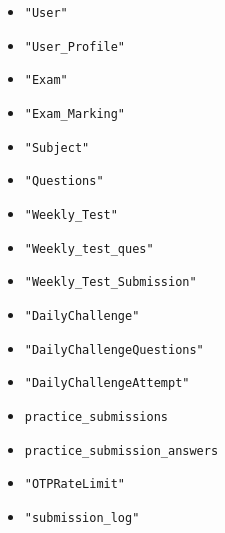 \documentclass[12pt,a4paper]{article}
\begin{document}
\begin{itemize}[leftmargin=1.5em]
  \item \texttt{"User"}
  \item \texttt{"User\_Profile"}
  \item \texttt{"Exam"}
  \item \texttt{"Exam\_Marking"}
  \item \texttt{"Subject"}
  \item \texttt{"Questions"}
  \item \texttt{"Weekly\_Test"}
  \item \texttt{"Weekly\_test\_ques"}
  \item \texttt{"Weekly\_Test\_Submission"}
  \item \texttt{"DailyChallenge"}
  \item \texttt{"DailyChallengeQuestions"}
  \item \texttt{"DailyChallengeAttempt"}
  \item \texttt{practice\_submissions}
  \item \texttt{practice\_submission\_answers}
  \item \texttt{"OTPRateLimit"}
  \item \texttt{"submission\_log"}
\end{itemize}
\end{document}
